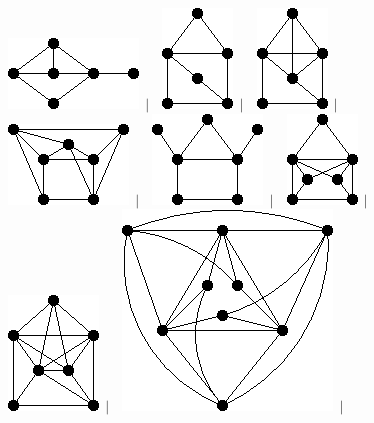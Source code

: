 \documentclass[11pt,paper=b5,footinclude,headinclude]{scrbook} %
\newtheorem{ex}{Vaja\hypertarget{sol:\theex}}[chapter]
\begin{document}
\begin{ex}
\begin{figure}
\includegraphics[scale=0.5]{smallGraphs/g_co-X170.png}$\,\mid\,$\
\includegraphics[scale=0.5]{smallGraphs/g_co-X171.png}$\,\mid\,$\
\includegraphics[scale=0.5]{smallGraphs/g_co-X172.png}$\,\mid\,$\
\includegraphics[scale=0.5]{smallGraphs/g_co-X173.png}$\,\mid\,$\
\includegraphics[scale=0.5]{smallGraphs/g_co-X175.png}$\,\mid\,$\
\includegraphics[scale=0.5]{smallGraphs/g_co-X176.png}$\,\mid\,$\
\includegraphics[scale=0.5]{smallGraphs/g_co-X177.png}$\,\mid\,$\
\includegraphics[scale=0.5]{smallGraphs/g_co-X179.png}$\,\mid\,$\

\end{figure}
\end{ex}
\end{document}
